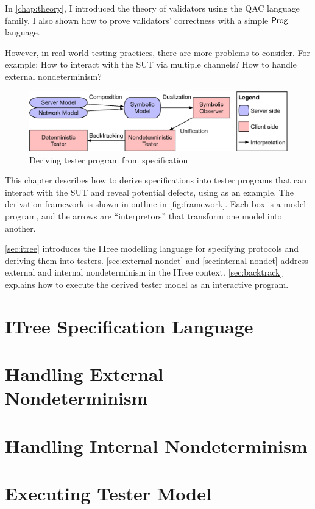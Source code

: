 In \autoref{chap:theory}, I introduced the theory of validators using the QAC
language family.  I also shown how to prove validators' correctness with a
simple $\mathsf{Prog}$ language.

However, in real-world testing practices, there are more problems to consider.
For example: How to interact with the SUT via multiple channels?  How to handle
external nondeterminism?

\begin{figure}
  \includegraphics[width=\linewidth]{figures/framework}
  \caption{Deriving tester program from specification}
  \label{fig:framework}
\end{figure}

This chapter describes how to derive specifications into tester programs that
can interact with the SUT and reveal potential defects, using \http as an
example.  The derivation framework is shown in outline in
\autoref{fig:framework}.  Each box is a model program, and the arrows are
``interpretors'' that transform one model into another.

\autoref{sec:itree} introduces the ITree modelling language for specifying
protocols and deriving them into testers.  \autoref{sec:external-nondet} and
\autoref{sec:internal-nondet} address external and internal nondeterminism in
the ITree context.  \autoref{sec:backtrack} explains how to execute the derived
tester model as an interactive program.

\section{ITree Specification Language}
\label{sec:itree}


\section{Handling External Nondeterminism}
\label{sec:external-nondet}


\section{Handling Internal Nondeterminism}
\label{sec:internal-nondet}


\section{Executing Tester Model}
\label{sec:backtrack}

